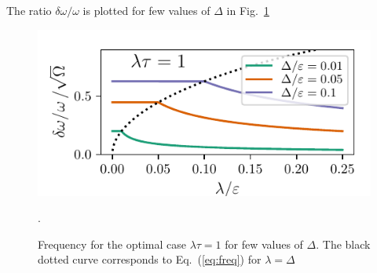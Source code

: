 The ratio $\delta\omega/\omega$ is plotted for few values of $\Delta$ in Fig.~\ref{fig:freqs}
\begin{figure}
    \centering
    \includegraphics{gfx/Chapter04/freq_plot.pdf}
    \caption{Frequency for the optimal case $\lambda\tau=1$ for few values of $\Delta$. The black dotted curve corresponds to Eq.~(\ref{eq:freq}) for $\lambda=\Delta$}. 
    \label{fig:freqs}
\end{figure}